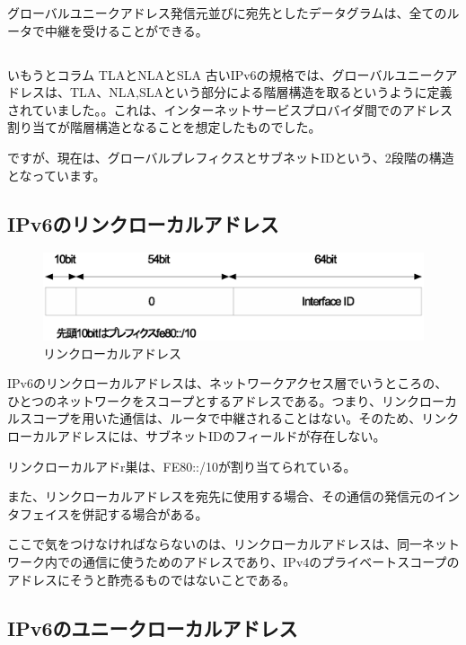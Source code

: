 グローバルユニークアドレス発信元並びに宛先としたデータグラムは、全てのルータで中継を受けることができる。

\subsection*{}
\begin{itembox}[l]{いもうとコラム TLAとNLAとSLA}
古いIPv6の規格では、グローバルユニークアドレスは、TLA、NLA,SLAという部分による階層構造を取るというように定義されていました。。これは、インターネットサービスプロバイダ間でのアドレス割り当てが階層構造となることを想定したものでした。

ですが、現在は、グローバルプレフィクスとサブネットIDという、2段階の構造となっています。

\end{itembox}

\subsection{IPv6のリンクローカルアドレス}

\begin{figure}[htbp]
	\includegraphics[width=12cm,clip]{draw/lla.eps}
	\caption{リンクローカルアドレス}
	\label{fig:lla}
\end{figure}

IPv6のリンクローカルアドレスは、ネットワークアクセス層でいうところの、ひとつのネットワークをスコープとするアドレスである。つまり、リンクローカルスコープを用いた通信は、ルータで中継されることはない。そのため、リンクローカルアドレスには、サブネットIDのフィールドが存在しない。

リンクローカルアドr巣は、FE80::/10が割り当てられている。

また、リンクローカルアドレスを宛先に使用する場合、その通信の発信元のインタフェイスを併記する場合がある。

ここで気をつけなければならないのは、リンクローカルアドレスは、同一ネットワーク内での通信に使うためのアドレスであり、IPv4のプライベートスコープのアドレスにそうと酢売るものではないことである。


\subsection{IPv6のユニークローカルアドレス}

